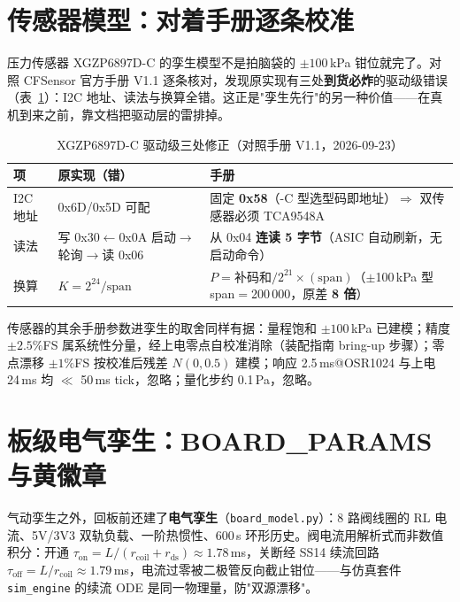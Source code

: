\section{传感器模型：对着手册逐条校准}
\label{sec:twin-sensor}

压力传感器 XGZP6897D-C 的孪生模型不是拍脑袋的 $\pm100$\,kPa 钳位就完了。对照 CFSensor 官方手册 V1.1 逐条核对，发现原实现有三处\textbf{到货必炸}的驱动级错误（表~\ref{tab:twin-xgzp}）：I2C 地址、读法与换算全错。这正是"孪生先行"的另一种价值——在真机到来之前，靠文档把驱动层的雷排掉。

\begin{table}[htbp]
  \centering
  \caption{XGZP6897D-C 驱动级三处修正（对照手册 V1.1，2026-09-23）}
  \label{tab:twin-xgzp}
  \begin{tabular}{llp{4.6cm}}
    \toprule
    项 & 原实现（错） & 手册 \\
    \midrule
    I2C 地址 & 0x6D/0x5D 可配 & 固定 \textbf{0x58}（-C 型选型码即地址）$\Rightarrow$ 双传感器必须 TCA9548A \\
    读法 & 写 0x30$\leftarrow$0x0A 启动$\to$轮询$\to$读 0x06 & 从 0x04 \textbf{连读 5 字节}（ASIC 自动刷新，无启动命令） \\
    换算 & $K=2^{24}/\text{span}$ & $P=\text{补码和}/2^{21}\times(\text{span})$（$\pm$100\,kPa 型 span$=$200\,000，原差 \textbf{8 倍}） \\
    \bottomrule
  \end{tabular}
\end{table}

传感器的其余手册参数进孪生的取舍同样有据：量程饱和 $\pm100$\,kPa 已建模；精度 $\pm2.5\%$FS 属系统性分量，经上电零点自校准消除（装配指南 bring-up 步骤）；零点漂移 $\pm1\%$FS 按校准后残差 $N(0,0.5)$ 建模；响应 2.5\,ms@OSR1024 与上电 24\,ms 均 $\ll$ 50\,ms tick，忽略；量化步约 0.1\,Pa，忽略。

\section{板级电气孪生：BOARD\_PARAMS 与黄徽章}
\label{sec:twin-board}

气动孪生之外，回板前还建了\textbf{电气孪生}（\texttt{board\_model.py}）：8 路阀线圈的 RL 电流、5V/3V3 双轨负载、一阶热惯性、600\,s 环形历史。阀电流用解析式而非数值积分：开通 $\tau_\text{on}=L/(r_\text{coil}+r_\text{ds})\approx1.78$\,ms，关断经 SS14 续流回路 $\tau_\text{off}=L/r_\text{coil}\approx1.79$\,ms，电流过零被二极管反向截止钳位——与仿真套件 \texttt{sim\_engine} 的续流 ODE 是同一物理量，防"双源漂移"。

